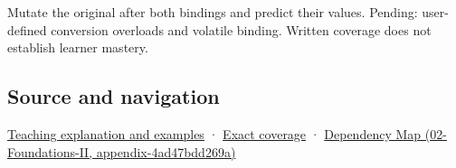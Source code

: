 Mutate the original after both bindings and predict their values. Pending: user-defined conversion overloads and volatile binding. Written coverage does not establish learner mastery.

\subsection{Source and navigation}\label{appendix-37856d997bb0-source-and-navigation}

\hyperref[01-foundations-i-ch003-binding-chooses-a-referent-not-always-the-one-you-imagined]{Teaching explanation and examples} · \hyperref[appendix-fd090d982a15-m008---parts-113-126]{Exact coverage} · \href{../02-Foundations-II/main.pdf\#nameddest=appendix-4ad47bdd269a}{Dependency Map (02-Foundations-II, appendix-4ad47bdd269a)}
